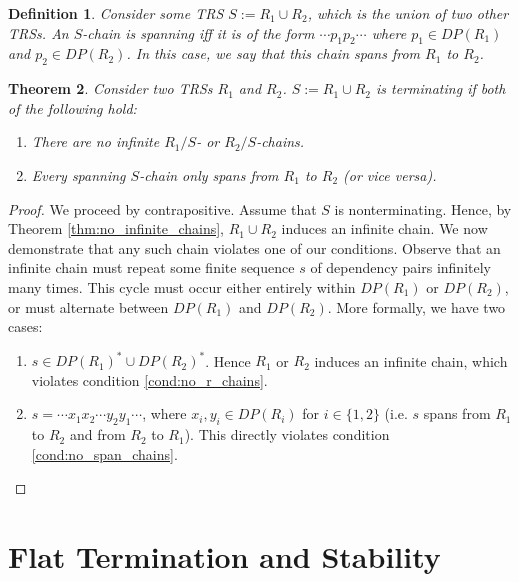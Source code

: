 \documentclass{article}
\newtheorem{theorem}{Theorem}[section]
\newtheorem{definition}[theorem]{Definition}
\renewcommand\em{\bfseries}
\begin{document}
\begin{definition}
    Consider some TRS $S := R_1 \cup R_2$, which is the union of two other TRSs. An $S$-chain is \emph{spanning} iff it is of the form $\cdots p_1 p_2 \cdots$ where $p_1 \in DP(R_1)$ and $p_2 \in DP(R_2)$. In this case, we say that this chain spans \emph{from} $R_1$ \emph{to} $R_2$.
\end{definition}

\begin{theorem}
    Consider two TRSs $R_1$ and $R_2$. $S := R_1 \cup R_2$ is terminating if both of the following hold: \begin{enumerate}
        \item There are no infinite $R_1/S$- or $R_2/S$-chains. \label{cond:no_r_chains}
        \item Every spanning $S$-chain only spans from $R_1$ to $R_2$ (or vice versa). \label{cond:no_span_chains}
    \end{enumerate}
\end{theorem}

\begin{proof}
    We proceed by contrapositive. Assume that $S$ is nonterminating. Hence, by Theorem \ref{thm:no_infinite_chains}, $R_1 \cup R_2$ induces an infinite chain. We now demonstrate that any such chain violates one of our conditions. Observe that an infinite chain must repeat some finite sequence $s$ of dependency pairs infinitely many times. This cycle must occur either entirely within $DP(R_1)$ or $DP(R_2)$, or must alternate between $DP(R_1)$ and $DP(R_2)$. More formally, we have two cases: \begin{enumerate}
        \item $s \in DP(R_1)^* \cup DP(R_2)^*$. Hence $R_1$ or $R_2$ induces an infinite chain, which violates condition \eqref{cond:no_r_chains}. 
        
        \item $s = \cdots x_1 x_2 \cdots y_2 y_1 \cdots$, where $x_i, y_i \in DP(R_i)$ for $i \in \{1, 2\}$ (i.e. $s$ spans from $R_1$ to $R_2$ and from $R_2$ to $R_1$). This directly violates condition \eqref{cond:no_span_chains}. 
    \end{enumerate}
\end{proof}

\section{Flat Termination and Stability}

\renewcommand\em{\it}
\printbibliography[title={References}]
\end{document}
